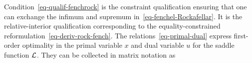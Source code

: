 Condition~\eqref{eq-qualif-fenchrock} is the constraint qualification ensuring that one can exchange the infimum and supremum in~\eqref{eq-fenchel-Rockafellar}. It is the relative-interior qualification corresponding to the equality-constrained reformulation~\eqref{eq-deriv-rock-fench}.
%
The relations~\eqref{eq-primal-dual} express first-order optimality in the primal variable $x$ and dual variable $u$ for the saddle function $\mathcal{L}$. They can be collected in matrix notation as

